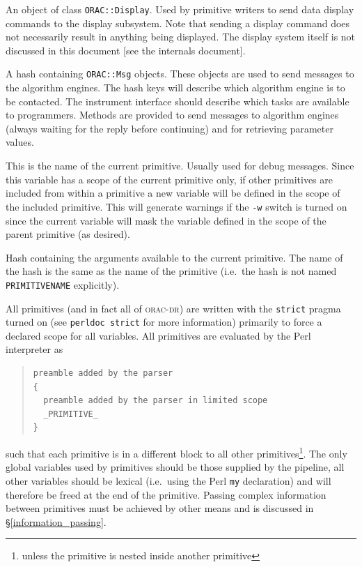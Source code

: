\documentclass[twoside,11pt]{article}
\renewcommand{\_}{\texttt{\symbol{95}}}
\newcommand{\Oracdr}{\textsc{orac-dr}}
\newenvironment{myquote}{\begin{quote}\begin{small}}{\end{small}\end{quote}}
\begin{document}
\begin{description}
An object of class \texttt{ORAC::Display}. Used by primitive writers
to send data display commands to the display subsystem. Note that
sending a display command does not necessarily result in anything
being displayed. The display system itself is not discussed in this document
[see the internals document].

\item[\%Mon] \mbox{}

A hash containing \texttt{ORAC::Msg} objects. These objects are used
to send messages to the algorithm engines. The hash keys will describe 
which algorithm engine is to be contacted. The instrument interface
should describe which tasks are available to programmers. Methods are
provided to send messages to algorithm engines (always waiting for the
reply before continuing) and for retrieving parameter values.

\item[\$ORAC\_PRIMITIVE] \mbox{} %

This is the name of the current primitive. Usually used for debug
messages. Since this variable has a scope of the current primitive
only, if other primitives are included from within a primitive 
a new variable will be defined in the scope of the included
primitive. This will generate warnings if the \texttt{-w} switch
is turned on since the current variable will mask the variable defined
in the scope of the parent primitive (as desired).


\item[\%\_PRIMITIVE\_NAME\_] \mbox{}

Hash containing the arguments available to the current primitive. The
name of the hash is the same as the name of the primitive (i.e.\ the
hash is not named \texttt{\_PRIMITIVE\_NAME\_} explicitly).

\end{description}

All primitives (and in fact all of \Oracdr) are written with the 
\texttt{strict} pragma turned on (see \texttt{perldoc strict} for more 
information) primarily to force a declared scope for all variables.
All primitives are evaluated by the Perl interpreter as
\begin{myquote}
\begin{verbatim}
preamble added by the parser
{
  preamble added by the parser in limited scope
  _PRIMITIVE_
}
\end{verbatim}
\end{myquote}
such that each primitive is in a different block to all other
primitives\footnote{unless the primitive is nested inside another
primitive}. The only global variables used by primitives should be
those supplied by the pipeline, all other variables should be lexical
(i.e.\ using the Perl \texttt{my} declaration) and will therefore be
freed at the end of the primitive. Passing complex information between 
primitives must be achieved by other means and is discussed in
\S\ref{information_passing}. 
\end{document}
